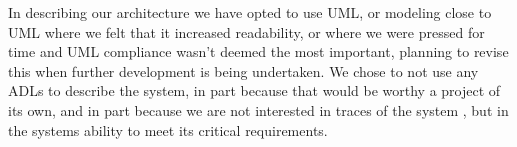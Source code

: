 In describing our architecture we have opted to use UML, or modeling close to
UML where we felt that it increased readability, or where we were pressed for time and
UML compliance wasn't deemed the most important, planning to revise this when
further development is being undertaken. We chose to not use any ADLs to describe the
system, in part because that would be worthy a project of its own, and in part because we 
are not interested in traces of the system 
\cite[p. 42-43]{Roscoe:2005:TPC:550448},
but in the systems ability to meet its critical requirements. 



